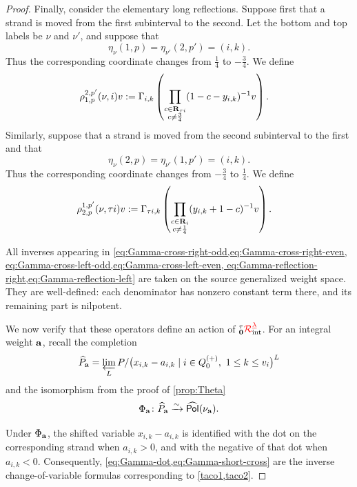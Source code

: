 \begin{proof}
Finally, consider the elementary long reflections. Suppose first that a
strand is moved from the first subinterval to the second. Let the bottom and
top labels be \(\nu\) and \(\nu'\), and suppose that
\[
   \eta_\nu(1,p)
   =
   \eta_{\nu'}(2,p')
   =
   (i,k).
\]
Thus the corresponding coordinate changes from \(\frac14\) to
\(-\frac34\). We define
\begin{equation}
\label{eq:Gamma-reflection-right}
\begin{aligned}
\rho_{1,p}^{2,p'}(\nu,i)v
:={}&
\Gamma_{i,k}
\left(
   \prod_{\substack{c\in\mathbf{R}_{\tau i}\\c\neq\frac34}}
   (1-c-y_{i,k})^{-1}v
\right).
\end{aligned}
\end{equation}
Similarly, suppose that a strand is moved from the second subinterval to the
first and that
\[
   \eta_\nu(2,p)
   =
   \eta_{\nu'}(1,p')
   =
   (i,k).
\]
Thus the corresponding coordinate changes from \(-\frac34\) to
\(\frac14\). We define
\begin{equation}
\label{eq:Gamma-reflection-left}
\begin{aligned}
\rho_{2,p}^{1,p'}(\nu,\tau i)v
:={}&
\Gamma_{\tau i,k}
\left(
   \prod_{\substack{c\in\mathbf{R}_i\\c\neq\frac14}}
   (y_{i,k}+1-c)^{-1}v
\right).
\end{aligned}
\end{equation}

All inverses appearing in
\cref{eq:Gamma-cross-right-odd,eq:Gamma-cross-right-even,
eq:Gamma-cross-left-odd,eq:Gamma-cross-left-even,
eq:Gamma-reflection-right,eq:Gamma-reflection-left}
are taken on the source generalized weight space. They are well-defined:
each denominator has nonzero constant term there, and its remaining part is
nilpotent. 

We now verify that these operators define an action of \({{}^\tau_{\mathbf{0}}{\color{red}\mathcal{R}}^{{{\color{red}\underline{\lambda}}}}_{\text{int}}}\). For an
integral weight \(\mathbf{a}\), recall the completion
\[
   \widehat P_{\mathbf{a}}
   =
   \varprojlim_L
   P/
   \bigl(
      x_{i,k}-a_{i,k}
      \mid
      i\in Q_0^{(+)},\ 1\leq k\leq v_i
   \bigr)^L
\]
and the isomorphism from the proof of \cref{prop:Theta}
\[
   \Phi_{\mathbf{a}}\colon
   \widehat P_{\mathbf{a}}
   \xrightarrow{\sim}
   \widehat{\mathsf{Pol}}(\nu_{\mathbf{a}}).
\]

Under \(\Phi_{\mathbf{a}}\), the shifted variable \(x_{i,k}-a_{i,k}\) is identified
with the dot on the corresponding strand when \(a_{i,k}>0\), and with the
negative of that dot when \(a_{i,k}<0\). Consequently,
\cref{eq:Gamma-dot,eq:Gamma-short-cross} are the inverse change-of-variable
formulas corresponding to \cref{taco1,taco2}.


\end{proof}
